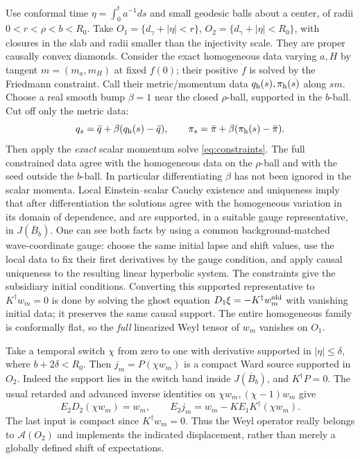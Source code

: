 \documentclass[11pt]{article}
\begin{document}
Use conformal time \(\eta=\int_0^t a^{-1}ds\) and small geodesic balls about a center, of radii \(0<r<\rho<b<R_0\). Take \(O_1=\{d_\gamma+|\eta|<r\}\), \(O_2=\{d_\gamma+|\eta|<R_0\}\), with closures in the slab and radii smaller than the injectivity scale. They are proper causally convex diamonds. Consider the exact homogeneous data varying \(a,H\) by tangent \(m=(m_a,m_H)\) at fixed \(f(0)\); their positive \(\dot f\) is solved by the Friedmann constraint. Call their metric/momentum data \(q_{\rm h}(s),\pi_{\rm h}(s)\) along \(sm\). Choose a real smooth bump \(\beta=1\) near the closed \(\rho\)-ball, supported in the \(b\)-ball. Cut off only the metric data:
\[
 q_s=\bar q+\beta(q_{\rm h}(s)-\bar q),\qquad
 \pi_s=\bar\pi+\beta(\pi_{\rm h}(s)-\bar\pi).
\]
Then apply the \emph{exact} scalar momentum solve \eqref{eq:constraints}. The full constrained data agree with the homogeneous data on the \(\rho\)-ball and with the seed outside the \(b\)-ball. In particular differentiating \(\beta\) has not been ignored in the scalar momenta. Local Einstein--scalar Cauchy existence and uniqueness imply that after differentiation the solutions agree with the homogeneous variation in its domain of dependence, and are supported, in a suitable gauge representative, in \(J(\overline B_b)\). One can see both facts by using a common background-matched wave-coordinate gauge: choose the same initial lapse and shift values, use the local data to fix their first derivatives by the gauge condition, and apply causal uniqueness to the resulting linear hyperbolic system. The constraints give the subsidiary initial conditions. Converting this supported representative to \(K^\dagger w_m=0\) is done by solving the ghost equation \(D_1\xi=-K^\dagger w_m^{\rm old}\) with vanishing initial data; it preserves the same causal support. The entire homogeneous family is conformally flat, so the \emph{full} linearized Weyl tensor of \(w_m\) vanishes on \(O_1\).

Take a temporal switch \(\chi\) from zero to one with derivative supported in \(|\eta|\le\delta\), where \(b+2\delta<R_0\). Then \(j_m=P(\chi w_m)\) is a compact Ward source supported in \(O_2\). Indeed the support lies in the switch band inside \(J(\overline B_b)\), and \(K^\dagger P=0\). The usual retarded and advanced inverse identities on \(\chi w_m,(\chi-1)w_m\) give
\begin{equation}
 E_2D_2(\chi w_m)=w_m,\qquad
 E_2j_m=w_m-KE_1K^\dagger(\chi w_m).
 \label{eq:switch}
\end{equation}
The last input is compact since \(K^\dagger w_m=0\). Thus the Weyl operator really belongs to \(\mathcal A(O_2)\) and implements the indicated displacement, rather than merely a globally defined shift of expectations.
\end{document}
